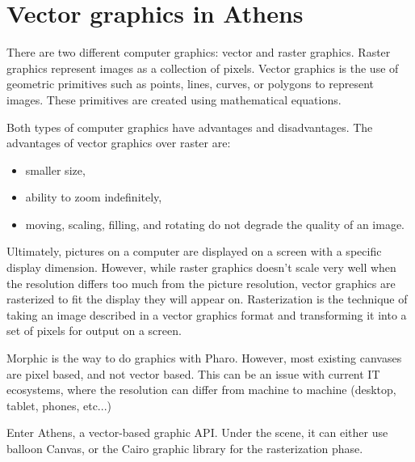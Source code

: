 \documentclass[10pt,twoside,english]{_support/latex/sbabook/sbabook}
\begin{document}
\frontmatter
\pagestyle{plain}

\tableofcontents*
\clearpage\listoffigures

\mainmatter


\chapter{Vector graphics in Athens}
There are two different computer graphics: vector and raster graphics.
Raster graphics represent images as a collection of pixels. Vector graphics
is the use of geometric primitives such as points, lines, curves, or polygons
to represent images. These primitives are created using mathematical equations.

Both types of computer graphics have advantages and disadvantages.
The advantages of vector graphics over raster are:

\begin{itemize}
    \item smaller size,
    \item ability to zoom indefinitely,
    \item moving, scaling, filling, and rotating do not degrade the quality of an image.
\end{itemize}

Ultimately, pictures on a computer are displayed on a screen with a specific
display dimension. However, while raster graphics doesn't scale very well when
the resolution differs too much from the picture resolution, vector graphics
are rasterized to fit the display they will appear on. Rasterization is the
technique of taking an image described in a vector graphics format and
transforming it into a set of pixels for output on a screen.

Morphic is the way to do graphics with Pharo.
However, most existing canvases are pixel based, and not vector based.
This can be an issue with current IT ecosystems, where the resolution can differ from machine to machine (desktop, tablet, phones, etc...)

Enter Athens, a vector-based graphic API. Under the scene, it can either use
balloon Canvas, or the Cairo graphic library for the rasterization phase.
\end{document}
